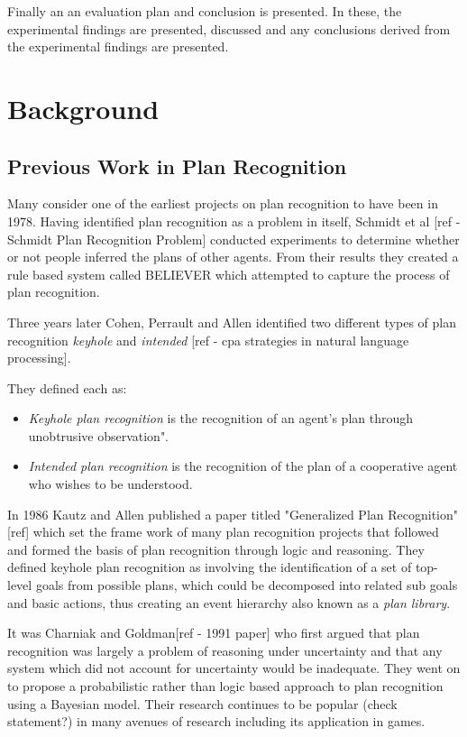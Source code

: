 \documentclass[parskip]{cs4rep}
\begin{document}
Finally an an evaluation plan and conclusion is presented. In these, the experimental findings are presented, discussed and any conclusions derived from the experimental findings are presented.

\chapter{Background}

\section{Previous Work in Plan Recognition}

Many consider one of the earliest projects on plan recognition to have been in 1978. Having identified plan recognition as a problem in itself, Schmidt et al [ref - Schmidt Plan Recognition Problem] conducted experiments to determine whether or not people inferred the plans of other agents. From their results they created a rule based system called BELIEVER which attempted to capture the process of plan recognition. 

Three years later Cohen, Perrault and Allen identified two different types of plan recognition \textit{keyhole} and \textit{intended} [ref - cpa strategies in natural language processing]. 

They defined each as:

\begin{itemize}
\item
\textit{Keyhole plan recognition} is the recognition of an agent's plan through unobtrusive observation".
\item
\textit{Intended plan recognition} is the recognition of the plan of a cooperative agent who wishes to be understood.
\newline
\end{itemize}

In 1986 Kautz and Allen published a paper titled "Generalized Plan Recognition"[ref] which set the frame work of many plan recognition projects that followed and formed the basis of plan recognition through logic and reasoning. They defined keyhole plan recognition as involving the identification of a set of top-level goals from possible plans, which could be decomposed into related sub goals and basic actions, thus creating an event hierarchy also known as a \textit{plan library}. 

It was Charniak and Goldman[ref - 1991 paper] who first argued that plan recognition was largely a problem of reasoning under uncertainty and that any system which did not account for uncertainty would be inadequate. They went on to propose a probabilistic rather than logic based approach to  plan recognition using a Bayesian model. Their research continues to be popular (check statement?) in many avenues of research including its application in games.
\end{document}
